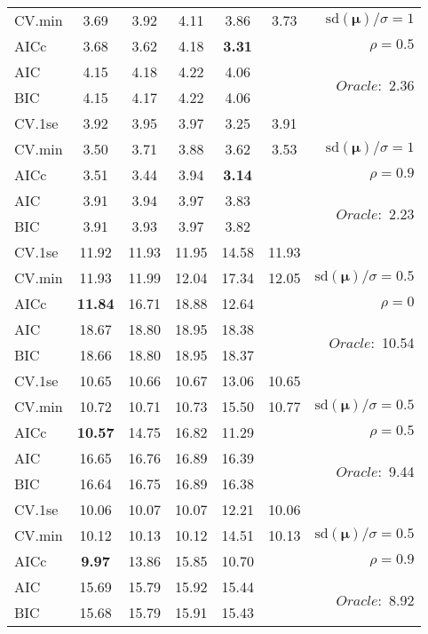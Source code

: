 \begin{table}
\begin{center}
\begin{tabular}{l*{5}{c}|r}
CV.min & 3.69 & 3.92 & 4.11 & 3.86 & 3.73 &  $\mathrm{sd}(\mathbf{\mu})/\sigma=1$ \\
AICc & 3.68 & 3.62 & 4.18 & {\bf 3.31} & & $\rho=0.5$ \\
AIC & 4.15 & 4.18 & 4.22 & 4.06 & &  \multirow{2}{*}{$Oracle: $ 2.36} \\
BIC & 4.15 & 4.17 & 4.22 & 4.06 & &  \\
 \hline 
CV.1se & 3.92 & 3.95 & 3.97 & 3.25 & 3.91 & \\
CV.min & 3.50 & 3.71 & 3.88 & 3.62 & 3.53 &  $\mathrm{sd}(\mathbf{\mu})/\sigma=1$ \\
AICc & 3.51 & 3.44 & 3.94 & {\bf 3.14} & & $\rho=0.9$ \\
AIC & 3.91 & 3.94 & 3.97 & 3.83 & &  \multirow{2}{*}{$Oracle: $ 2.23} \\
BIC & 3.91 & 3.93 & 3.97 & 3.82 & &  \\
 \hline 
CV.1se & 11.92 & 11.93 & 11.95 & 14.58 & 11.93 & \\
CV.min & 11.93 & 11.99 & 12.04 & 17.34 & 12.05 &  $\mathrm{sd}(\mathbf{\mu})/\sigma=0.5$ \\
AICc & {\bf 11.84} & 16.71 & 18.88 & 12.64 & & $\rho=0$ \\
AIC & 18.67 & 18.80 & 18.95 & 18.38 & &  \multirow{2}{*}{$Oracle: $ 10.54} \\
BIC & 18.66 & 18.80 & 18.95 & 18.37 & &  \\
 \hline 
CV.1se & 10.65 & 10.66 & 10.67 & 13.06 & 10.65 & \\
CV.min & 10.72 & 10.71 & 10.73 & 15.50 & 10.77 &  $\mathrm{sd}(\mathbf{\mu})/\sigma=0.5$ \\
AICc & {\bf 10.57} & 14.75 & 16.82 & 11.29 & & $\rho=0.5$ \\
AIC & 16.65 & 16.76 & 16.89 & 16.39 & &  \multirow{2}{*}{$Oracle: $ 9.44} \\
BIC & 16.64 & 16.75 & 16.89 & 16.38 & &  \\
 \hline 
CV.1se & 10.06 & 10.07 & 10.07 & 12.21 & 10.06 & \\
CV.min & 10.12 & 10.13 & 10.12 & 14.51 & 10.13 &  $\mathrm{sd}(\mathbf{\mu})/\sigma=0.5$ \\
AICc & {\bf 9.97} & 13.86 & 15.85 & 10.70 & & $\rho=0.9$ \\
AIC & 15.69 & 15.79 & 15.92 & 15.44 & &  \multirow{2}{*}{$Oracle: $ 8.92} \\
BIC & 15.68 & 15.79 & 15.91 & 15.43 & &  \\
 \hline 
\end{tabular}
\end{center}
\vspace{-1cm}
\end{table}




